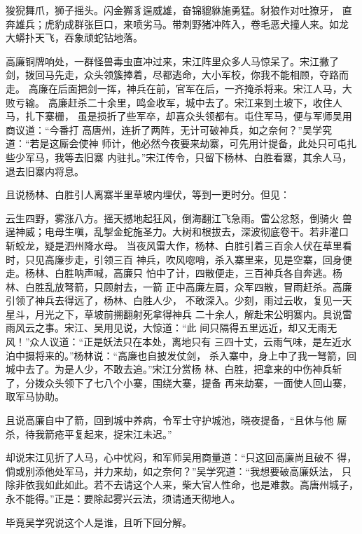 狻猊舞爪，狮子摇头。闪金獬豸逞威雄，奋锦貔貅施勇猛。豺狼作对吐獠牙，
直奔雄兵；虎豹成群张巨口，来喷劣马。带刺野猪冲阵入，卷毛恶犬撞人来。如龙
大蟒扑天飞，吞象顽蛇钻地落。

高廉铜牌响处，一群怪兽毒虫直冲过来，宋江阵里众多人马惊呆了。宋江撇了
剑，拨回马先走，众头领簇捧着，尽都逃命，大小军校，你我不能相顾，夺路而走。
高廉在后面把剑一挥，神兵在前，官军在后，一齐掩杀将来。宋江人马，大败亏输。
高廉赶杀二十余里，鸣金收军，城中去了。宋江来到土坡下，收住人马，扎下寨栅，
虽是损折了些军卒，却喜众头领都有。屯住军马，便与军师吴用商议道：“今番打
高唐州，连折了两阵，无计可破神兵，如之奈何？”吴学究道：“若是这厮会使神
师计，他必然今夜要来劫寨，可先用计提备，此处只可屯扎些少军马，我等去旧寨
内驻扎。”宋江传令，只留下杨林、白胜看寨，其余人马，退去旧寨内将息。

且说杨林、白胜引人离寨半里草坡内埋伏，等到一更时分。但见：

云生四野，雾涨八方。摇天撼地起狂风，倒海翻江飞急雨。雷公忿怒，倒骑火
兽逞神威；电母生嗔，乱掣金蛇施圣力。大树和根拔去，深波彻底卷干。若非灌口
斩蛟龙，疑是泗州降水母。
当夜风雷大作，杨林、白胜引着三百余人伏在草里看时，只见高廉步走，引领三百
神兵，吹风唿哨，杀入寨里来，见是空寨，回身便走。杨林、白胜呐声喊，高廉只
怕中了计，四散便走，三百神兵各自奔逃。杨林、白胜乱放弩箭，只顾射去，一箭
正中高廉左肩，众军四散，冒雨赶杀。高廉引领了神兵去得远了，杨林、白胜人少，
不敢深入。少刻，雨过云收，复见一天星斗，月光之下，草坡前搠翻射死拿得神兵
二十余人，解赴宋公明寨内。具说雷雨风云之事。宋江、吴用见说，大惊道：“此
间只隔得五里远近，却又无雨无风！”众人议道：“正是妖法只在本处，离地只有
三四十丈，云雨气味，是左近水泊中摄将来的。”杨林说：“高廉也自披发仗剑，
杀入寨中，身上中了我一弩箭，回城中去了。为是人少，不敢去追。”宋江分赏杨
林、白胜，把拿来的中伤神兵斩了，分拨众头领下了七八个小寨，围绕大寨，提备
再来劫寨，一面使人回山寨，取军马协助。

且说高廉自中了箭，回到城中养病，令军士守护城池，晓夜提备，“且休与他
厮杀，待我箭疮平复起来，捉宋江未迟。”

却说宋江见折了人马，心中忧闷，和军师吴用商量道：“只这回高廉尚且破不
得，倘或别添他处军马，并力来劫，如之奈何？”吴学究道：“我想要破高廉妖法，
只除非依我如此如此。若不去请这个人来，柴大官人性命，也是难救。高唐州城子，
永不能得。”正是：要除起雾兴云法，须请通天彻地人。

毕竟吴学究说这个人是谁，且听下回分解。